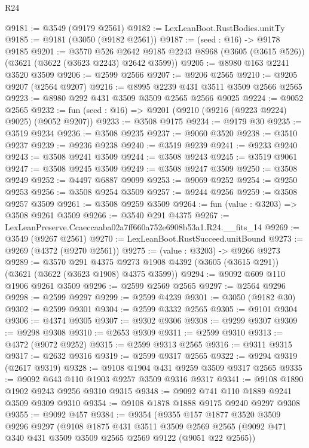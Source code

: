 \begin{lexlean}{R24}
\begin{coremodule}
@9181 := @3549 (@9179 @2561)
@9182 := LexLeanBoot.RustBodies.unitTy
@9185 := @9181 (@3050 (@9182 @2561))
@9187 := (seed : @16) -> @9178 @9185
@9201 := @3570
    @526
    @2642
    @9185
    @2243
    @8968
    (@3605 (@3615 @526))
    (@3621 (@3622 (@3623 @2243) @2642 @3599))
@9205 := @8980 @163 @2241 @3520 @3509
@9206 := @2599 @2566
@9207 := @9206 @2565
@9210 := @9205 @9207 (@2564 @9207)
@9216 := @8995 @2239 @431 @3511 @3509 @2566 @2565
@9223 := @8980 @292 @431 @3509 @3509 @2565 @2566 @9025
@9224 := @9052 @2565
@9232 := fun (seed : @16) => @9201 (@9210 (@9216 (@9223 @9224) @9025) (@9052 @9207))
@9233 := @3508 @9175
@9234 := @9179 @30
@9235 := @3519 @9234
@9236 := @3508 @9235
@9237 := @9060 @3520
@9238 := @3510 @9237
@9239 := @9236 @9238
@9240 := @3519 @9239
@9241 := @9233 @9240
@9243 := @3508 @9241 @3509
@9244 := @3508 @9243
@9245 := @3519 @9061
@9247 := @3508 @9245 @3509
@9249 := @3508 @9247 @3509
@9250 := @3508 @9249
@9252 := @4497 @6887 @9099
@9253 := @9069 @9252
@9254 := @9250 @9253
@9256 := @3508 @9254 @3509
@9257 := @9244 @9256
@9259 := @3508 @9257 @3509
@9261 := @3508 @9259 @3509
@9264 := fun (value : @3203) => @3508 @9261 @3509
@9266 := @3540 @291 @4375
@9267 := LexLeanPreserve.Ccaeccaaba02a7ff660a752e6908b53a1.R24.__fits_14
@9269 := @3549 (@9267 @2561)
@9270 := LexLeanBoot.RustSucceed.unitBound
@9273 := @9269 (@4372 (@9270 @2561))
@9275 := (value : @3203) -> @9266 @9273
@9289 := @3570
    @291
    @4375
    @9273
    @1908
    @4392
    (@3605 (@3615 @291))
    (@3621 (@3622 (@3623 @1908) @4375 @3599))
@9294 := @9092 @609 @110 @1906 @9261 @3509
@9296 := @2599 @2569 @2565
@9297 := @2564 @9296
@9298 := @2599 @9297
@9299 := @2599 @4239
@9301 := @3050 (@9182 @30)
@9302 := @2599 @9301
@9304 := @2599 @3332 @2565
@9305 := @9101 @9304
@9306 := @4374 @9305
@9307 := @9302 @9306
@9308 := @9299 @9307
@9309 := @9298 @9308
@9310 := @2653 @9309
@9311 := @2599 @9310
@9313 := @4372 (@9072 @9252)
@9315 := @2599 @9313 @2565
@9316 := @9311 @9315
@9317 := @2632 @9316
@9319 := @2599 @9317 @2565
@9322 := @9294 @9319 (@2617 @9319)
@9328 := @9108 @1904 @431 @9259 @3509 @9317 @2565
@9335 := @9092 @643 @110 @1903 @9257 @3509 @9316 @9317
@9341 := @9108 @1890 @1902 @9243 @9256 @9310 @9315
@9348 := @9092 @741 @110 @1889 @9241 @3509 @9309 @9310
@9354 := @9108 @1878 @1888 @9175 @9240 @9297 @9308
@9355 := @9092 @457
@9384 := @9354
    (@9355
      @157
      @1877
      @3520
      @3509
      @9296
      @9297
      (@9108
        @1875
        @431
        @3511
        @3509
        @2569
        @2565
        (@9092 @471 @340 @431 @3509 @3509 @2565 @2569 @9122 (@9051 @22 @2565))

\end{coremodule}
\end{lexlean}
